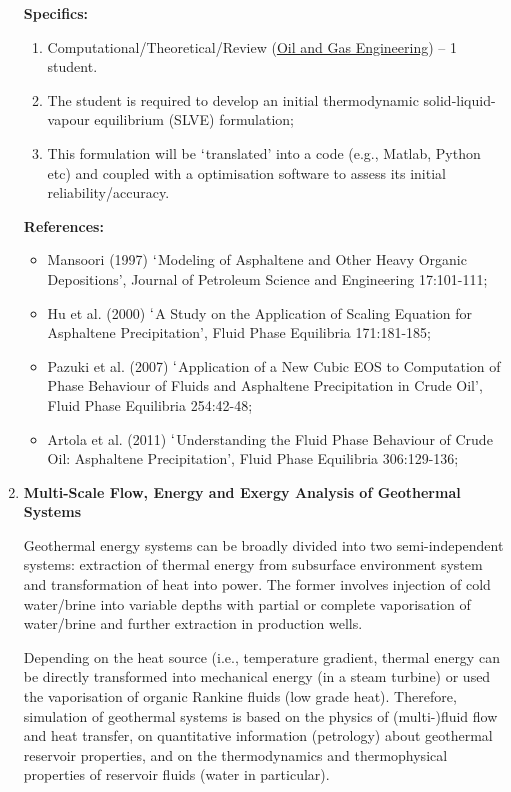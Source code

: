 \documentclass[12pts,a4paper,amsmath,amssymb,floatfix]{article}%
\begin{document}
\begin{enumerate}[label=\bfseries Project:]
\noindent
{\bf Specifics:} 
\begin{enumerate}
\item Computational/Theoretical/Review (\underline{Oil and Gas Engineering}) -- 1 student.
\item The student is required to develop an initial thermodynamic solid-liquid-vapour equilibrium (SLVE) formulation;
\item This formulation will be $\lq$translated' into a code (e.g., Matlab, Python etc) and coupled with a optimisation software to assess its initial reliability/accuracy.
\end{enumerate}

\noindent
{\bf References:}
\begin{itemize}
\item Mansoori (1997) $\lq$Modeling of Asphaltene and Other Heavy Organic Depositions’, Journal of Petroleum Science and Engineering 17:101-111;
\item Hu et al. (2000) $\lq$A Study on the Application of Scaling Equation for Asphaltene Precipitation’, Fluid Phase Equilibria 171:181-185;
\item Pazuki et al. (2007) $\lq$Application of a New Cubic EOS to Computation of Phase Behaviour of Fluids and Asphaltene Precipitation in Crude Oil’, Fluid Phase Equilibria 254:42-48;
\item Artola et al. (2011) $\lq$Understanding the Fluid Phase Behaviour of Crude Oil: Asphaltene Precipitation’, Fluid Phase Equilibria 306:129-136;
\end{itemize}


\clearpage
\item {\bf Multi-Scale Flow, Energy and Exergy Analysis of Geothermal Systems}

Geothermal energy systems can be broadly divided into two semi-independent systems: extraction of thermal energy from subsurface environment system and transformation of heat into power. The former involves injection of cold water/brine into variable depths with partial or complete vaporisation of water/brine and further extraction in production wells. 

Depending on the heat source (i.e., temperature gradient, thermal energy can be directly transformed into mechanical energy (in a steam turbine) or used the vaporisation of organic Rankine fluids (low grade heat). Therefore, simulation of geothermal systems is based on the physics of (multi-)fluid flow and heat transfer, on quantitative information (petrology) about geothermal reservoir properties, and on the thermodynamics and thermophysical properties of reservoir fluids (water in particular). 



\end{enumerate}
\end{document}
